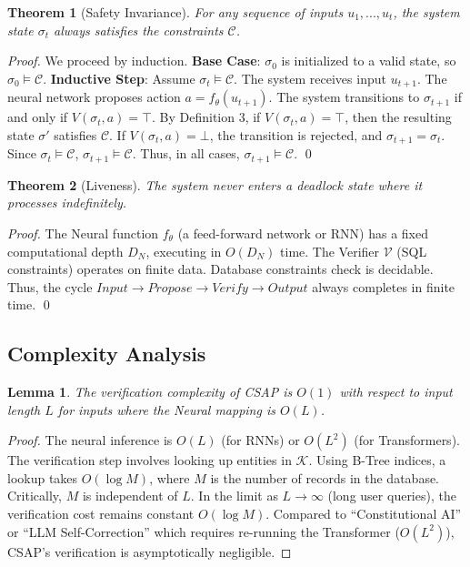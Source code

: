 \documentclass[11pt]{article}
\newtheorem{theorem}{Theorem}
\newtheorem{lemma}{Lemma}
\begin{document}
\begin{theorem}[Safety Invariance]
For any sequence of inputs $u_1, ..., u_t$, the system state $\sigma_t$ always satisfies the constraints $\mathcal{C}$.
\end{theorem}

\begin{proof}
We proceed by induction.
\textbf{Base Case}: $\sigma_0$ is initialized to a valid state, so $\sigma_0 \models \mathcal{C}$.
\textbf{Inductive Step}: Assume $\sigma_t \models \mathcal{C}$. The system receives input $u_{t+1}$.
The neural network proposes action $a = f_\theta(u_{t+1})$.
The system transitions to $\sigma_{t+1}$ if and only if $V(\sigma_t, a) = \top$.
By Definition 3, if $V(\sigma_t, a) = \top$, then the resulting state $\sigma'$ satisfies $\mathcal{C}$.
If $V(\sigma_t, a) = \bot$, the transition is rejected, and $\sigma_{t+1} = \sigma_t$. Since $\sigma_t \models \mathcal{C}$, $\sigma_{t+1} \models \mathcal{C}$.
Thus, in all cases, $\sigma_{t+1} \models \mathcal{C}$. \qed
\end{proof}

\begin{theorem}[Liveness]
The system never enters a deadlock state where it processes indefinitely.
\end{theorem}

\begin{proof}
The Neural function $f_\theta$ (a feed-forward network or RNN) has a fixed computational depth $D_N$, executing in $O(D_N)$ time.
The Verifier $\mathcal{V}$ (SQL constraints) operates on finite data. Database constraints check is decidable.
Thus, the cycle $Input \rightarrow Propose \rightarrow Verify \rightarrow Output$ always completes in finite time. \qed
\end{proof}

\subsection{Complexity Analysis}
\begin{lemma}
The verification complexity of CSAP is $O(1)$ with respect to input length $L$ for inputs where the Neural mapping is $O(L)$.
\end{lemma}
\begin{proof}
The neural inference is $O(L)$ (for RNNs) or $O(L^2)$ (for Transformers). The verification step involves looking up entities in $\mathcal{K}$.
Using B-Tree indices, a lookup takes $O(\log M)$, where $M$ is the number of records in the database.
Critically, $M$ is independent of $L$.
In the limit as $L \to \infty$ (long user queries), the verification cost remains constant $O(\log M)$.
Compared to ``Constitutional AI'' or ``LLM Self-Correction'' which requires re-running the Transformer ($O(L^2)$), CSAP's verification is asymptotically negligible.
\end{proof}
\end{document}
